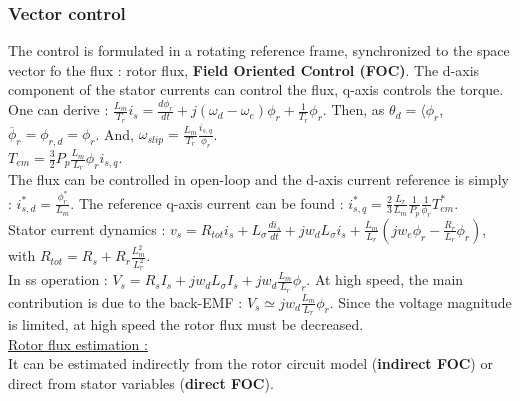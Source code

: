 \documentclass[../main.tex]{subfiles}
\begin{document}
\subsubsection{Vector control}
The control is formulated in a rotating reference frame, synchronized to the space vector fo the flux : rotor flux, \textbf{Field Oriented Control (FOC)}. The d-axis component of the stator currents can control the flux, q-axis controls the torque. \\

One can derive : $\frac{L_m}{T_r} i_s = \frac{d\phi_r}{dt} + j(\omega_d-\omega_e)\phi_r + \frac{1}{T_r} \phi_r$. Then, as $\theta_d = \langle \phi_r$, $\overline{\phi}_r = \phi_{r,d} = \phi_r$. And, $\omega_{slip} = \frac{L_m}{T_r} \frac{i_{s,q}}{\phi_r}$.\\
$T_{em} = \frac{3}{2} P_p\frac{L_m}{L_r} \phi_r i_{s,q}$.\\

The flux can be controlled in open-loop and the d-axis current reference is simply : $i^*_{s,d} = \frac{\phi_r^*}{L_m}$. The reference q-axis current can be found : $i^*_{s,q} = \frac{2}{3} \frac{L_r}{L_m} \frac{1}{P_p} \frac{1}{\phi_r}T_{em}^*$.\\

Stator current dynamics : $v_s = R_{tot} i_s + L_\sigma \frac{di_s}{dt} + j w_dL_\sigma i_s  + \frac{L_m}{L_r}(jw_e\phi_r - \frac{R_r}{L_r}\phi_r)$, with $R_{tot} = R_s + R_r \frac{L_m^2}{L_r^2}$.\\

In ss operation : $V_s = R_s I_s + jw_d L_\sigma I_s + jw_d \frac{L_m}{L_r} \phi_r$. At high speed, the main contribution is due to the back-EMF : $V_s \simeq jw_d \frac{L_m}{L_r} \phi_r$. Since the voltage magnitude is limited, at high speed the rotor flux must be decreased. \\

\quad \underline{Rotor flux estimation :}\\
It can be estimated indirectly from the rotor circuit model (\textbf{indirect FOC}) or direct from stator variables (\textbf{direct FOC}). \\
\end{document}
